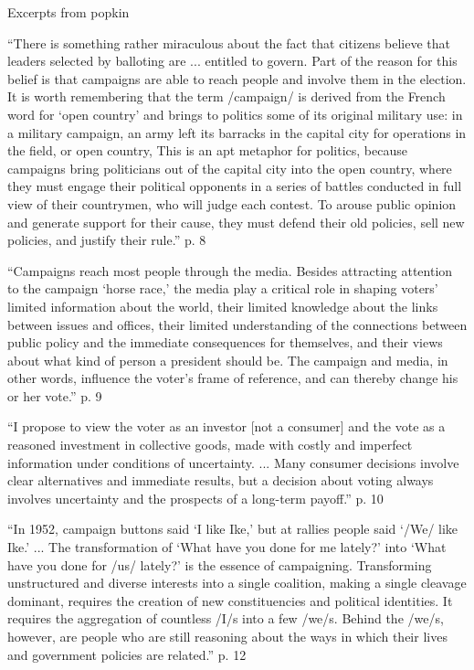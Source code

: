 Excerpts from popkin

``There is something rather miraculous about the fact that citizens believe that leaders selected by balloting are ... entitled to govern. Part of the reason for this belief is that campaigns are able to reach people and involve them in the election. It is worth remembering that the term /campaign/ is derived from the French word for `open country' and brings to politics some of its original military use: in a military campaign, an army left its barracks in the capital city for operations in the field, or open country, This is an apt metaphor for politics, because campaigns bring politicians out of the capital city into the open country, where they must engage their political opponents in a series of battles conducted in full view of their countrymen, who will judge each contest. To arouse public opinion and generate support for their cause, they must defend their old policies, sell new policies, and justify their rule.'' p. 8

``Campaigns reach most people through the media. Besides attracting attention to the campaign `horse race,' the media play a critical role in shaping voters' limited information about the world, their limited knowledge about the links between issues and offices, their limited understanding of the connections between public policy and the immediate consequences for themselves, and their views about what kind of person a president should be. The campaign and media, in other words, influence the voter's frame of reference, and can thereby change his or her vote.'' p. 9

``I propose to view the voter as an investor [not a consumer] and the vote as a reasoned investment in collective goods, made with costly and imperfect information under conditions of uncertainty. ... Many consumer decisions involve clear alternatives and immediate results, but a decision about voting always involves uncertainty and the prospects of a long-term payoff.'' p. 10

``In 1952, campaign buttons said `I like Ike,' but at rallies people said `/We/ like Ike.' ... The transformation of `What have you done for me lately?' into `What have you done for /us/ lately?' is the essence of campaigning. Transforming unstructured and diverse interests into a single coalition, making a single cleavage dominant, requires the creation of new constituencies and political identities. It requires the aggregation of countless /I/s into a few /we/s. Behind the /we/s, however, are people who are still reasoning about the ways in which their lives and government policies are related.'' p. 12

